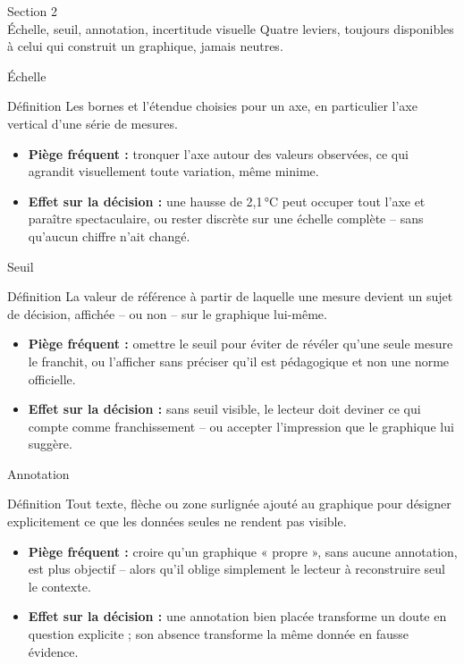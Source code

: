 \documentclass[aspectratio=169]{beamer}
\begin{document}
\begin{frame}[plain]
  \centering
  \Huge Section 2\\[3mm]
  \Large Échelle, seuil, annotation, incertitude visuelle
  \vfill
  \normalsize Quatre leviers, toujours disponibles à celui qui construit un graphique, jamais neutres.
\end{frame}

\begin{frame}{Échelle}
  \begin{block}{Définition}
    Les bornes et l'étendue choisies pour un axe, en particulier l'axe vertical d'une série de mesures.
  \end{block}
  \begin{itemize}
    \item \textbf{Piège fréquent :} tronquer l'axe autour des valeurs observées, ce qui agrandit visuellement toute variation, même minime.
    \item \textbf{Effet sur la décision :} une hausse de 2,1\,°C peut occuper tout l'axe et paraître spectaculaire, ou rester discrète sur une échelle complète -- sans qu'aucun chiffre n'ait changé.
  \end{itemize}
\end{frame}

\begin{frame}{Seuil}
  \begin{block}{Définition}
    La valeur de référence à partir de laquelle une mesure devient un sujet de décision, affichée -- ou non -- sur le graphique lui-même.
  \end{block}
  \begin{itemize}
    \item \textbf{Piège fréquent :} omettre le seuil pour éviter de révéler qu'une seule mesure le franchit, ou l'afficher sans préciser qu'il est pédagogique et non une norme officielle.
    \item \textbf{Effet sur la décision :} sans seuil visible, le lecteur doit deviner ce qui compte comme franchissement -- ou accepter l'impression que le graphique lui suggère.
  \end{itemize}
\end{frame}

\begin{frame}{Annotation}
  \begin{block}{Définition}
    Tout texte, flèche ou zone surlignée ajouté au graphique pour désigner explicitement ce que les données seules ne rendent pas visible.
  \end{block}
  \begin{itemize}
    \item \textbf{Piège fréquent :} croire qu'un graphique « propre », sans aucune annotation, est plus objectif -- alors qu'il oblige simplement le lecteur à reconstruire seul le contexte.
    \item \textbf{Effet sur la décision :} une annotation bien placée transforme un doute en question explicite ; son absence transforme la même donnée en fausse évidence.
  \end{itemize}
\end{frame}
\end{document}
